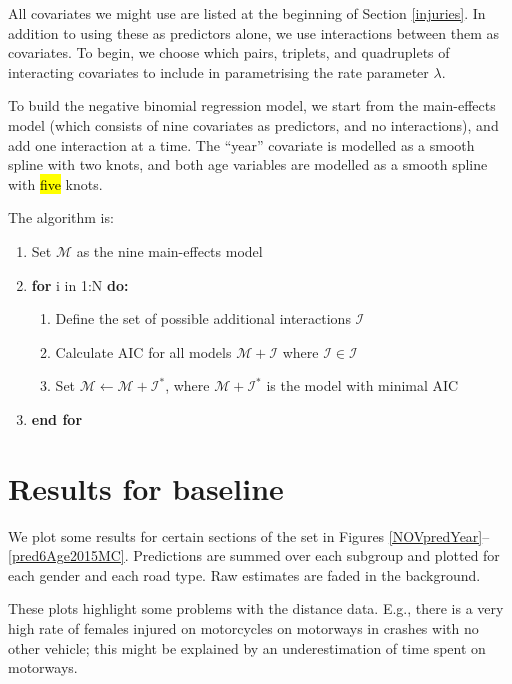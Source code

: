 \documentclass{article}
\begin{document}
All covariates we might use are listed at the beginning of Section \ref{injuries}. In addition to using these as predictors alone, we use interactions between them as covariates. To begin, we choose which pairs, triplets, and quadruplets of interacting covariates to include in parametrising the rate parameter $\lambda$.

To build the negative binomial regression model, we start from the main-effects model (which consists of nine covariates as predictors, and no interactions), and add one interaction at a time. The ``year'' covariate is modelled as a smooth spline with two knots, and both age variables are modelled as a smooth spline with \hl{five} knots. 

The algorithm is:
\begin{enumerate}
\item Set $\mathcal{M}$ as the nine main-effects model
\item \textbf{for} i in 1:N \textbf{do:}
\begin{enumerate}
\item Define the set of possible additional interactions $\mathscr{I}$
\item Calculate AIC for all models $\mathcal{M+I}$ where $\mathcal{I}\in\mathscr{I}$
\item Set $\mathcal{M}\leftarrow\mathcal{M+I^*}$, where $\mathcal{M+I^*}$ is the model with minimal AIC
\end{enumerate}
\item\textbf{end for}
\end{enumerate}

\section{Results for baseline}

We plot some results for certain sections of the set in Figures \ref{NOVpredYear}--\ref{pred6Age2015MC}. Predictions are summed over each subgroup and plotted for each gender and each road type. Raw estimates are faded in the background.

These plots highlight some problems with the distance data. E.g., there is a very high rate of females injured on motorcycles on motorways in crashes with no other vehicle; this might be explained by an underestimation of time spent on motorways.
\end{document}
